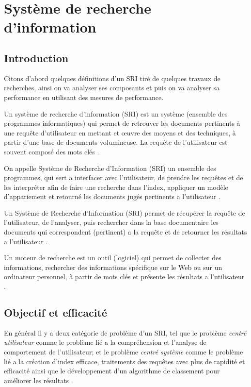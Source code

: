 \chapter{Système de recherche d'information}
\section{Introduction}
Citons d'abord quelques définitions d'un SRI tiré de quelques travaux de recherches, ainsi on va analyser ses composants et puis on va analyser sa performance en utilisant des mesures de performance.

\begin{definition}
    Un système de recherche d'information (SRI) est un système (ensemble des programmes informatiques) qui permet de retrouver les documents pertinents à une requête d'utilisateur en mettant et œuvre des moyens et des techniques, à partir d'une base de documents volumineuse. La requête de l'utilisateur est souvent composé des mots clés \citep{salton1989automatique,approche-semantique}.
\end{definition}

\begin{definition}
	On appelle Système de Recherche d'Information (SRI) un ensemble des programmes, qui sert a interfacer avec l'utilisateur, de prendre les requêtes et de les interpréter afin de faire une recherche dans l'index, appliquer un modèle d’appariement et retourné les documents jugés pertinents a l'utilisateur \citep{amelioration-ri-approche-semantique}.
\end{definition}

\begin{definition}
	Un Système de Recherche d'Information (SRI) permet de récupérer la requête de l'utilisateur, de l'analyser, puis rechercher dans la base documentaire les documents qui correspondent (pertinent) a la requête et de retourner les résultats a l'utilisateur \citep{vsm}.
\end{definition}

\begin{definition}
	Un moteur de recherche est un outil (logiciel) qui permet de collecter des informations, rechercher des informations spécifique sur le Web ou sur un ordinateur personnel, à partir de mots clés et présente les résultats a l'utilisateur \citep{jdn-moteur-de-recherche, mdn-search-engine}.
\end{definition}

\section{Objectif et efficacité}
En général il y a deux catégorie de problème d'un SRI, tel que le problème \emph{centré utilisateur} comme le problème lié a la compréhension et l'analyse de comportement de l'utilisateur; et le problème \emph{centré système} comme le problème lié a la création d'index efficace, traitements des requêtes avec plus de rapidité et efficacité ainsi que le développement d'un algorithme de classement pour améliorer les résultats \citep{modern-ir}.

